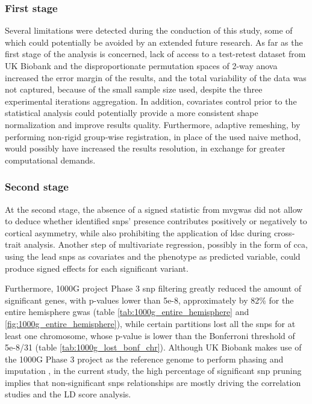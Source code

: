 \subsubsection{First stage}
Several limitations were detected during the conduction of this study, some of which could potentially be avoided by an extended future research. As far as the first stage of the analysis is concerned, lack of access to a test-retest dataset from UK Biobank and the disproportionate permutation spaces of 2-way \ac{anova} increased the error margin of the results, and the total variability of the data was not captured, because of the small sample size used, despite the three experimental iterations aggregation. In addition, covariates control prior to the statistical analysis could potentially provide a more consistent shape normalization and improve results quality. Furthermore, adaptive remeshing, by performing non-rigid group-wise registration, in place of the used naive method, would possibly have increased the results resolution, in exchange for greater computational demands.

\subsubsection{Second stage}
At the second stage, the absence of a signed statistic from \ac{mvgwas} did not allow to deduce whether identified \acp{snp}' presence contributes positively or negatively to cortical asymmetry, while also prohibiting the application of \ac{ldsc} during cross-trait analysis. Another step of multivariate regression, possibly in the form of \ac{cca}, using the lead \acp{snp} as covariates and the phenotype as predicted variable, could produce signed effects for each significant variant. 

Furthermore, 1000G project Phase 3 \ac{snp} filtering greatly reduced the amount of significant genes, with p-values lower than 5e-8, approximately by 82\% for the entire hemisphere \ac{gwas} (table \autoref{tab:1000g_entire_hemisphere} and \autoref{fig:1000g_entire_hemisphere}), while certain partitions lost all the \acp{snp} for at least one chromosome, whose p-value is lower than the Bonferroni threshold of 5e-8/31 (table \autoref{tab:1000g_lost_bonf_chr}). Although UK Biobank makes use of the 1000G Phase 3 project as the reference genome to perform phasing and imputation \cite{Bycroft2018}, in the current study, the high percentage of significant \ac{snp} pruning implies that non-significant \acp{snp} relationships are mostly driving the correlation studies and the LD score analysis.

